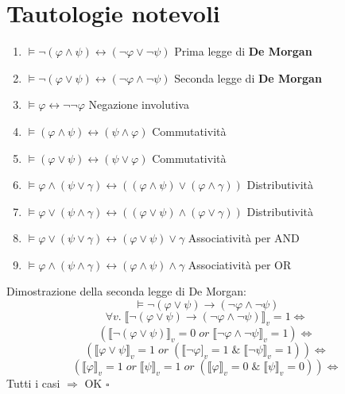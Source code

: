 \documentclass{article}
\theoremstyle{break}
\theoremstyle{break}
\theoremstyle{break}
\theoremstyle{break}
\begin{document}
\section{Tautologie notevoli}
\begin{enumerate}
  \item \( \models \neg (\varphi \wedge \psi) \leftrightarrow (\neg \varphi \vee \neg \psi) \) Prima legge di \textbf{De Morgan}
  \item \( \models \neg (\varphi \vee \psi) \leftrightarrow (\neg \varphi \wedge \neg \psi) \) Seconda legge di \textbf{De Morgan}
  \item \( \models \varphi \leftrightarrow \neg \neg \varphi \) Negazione involutiva
  \item \( \models (\varphi \wedge \psi) \leftrightarrow (\psi \wedge \varphi) \)  Commutatività
  \item \( \models (\varphi \vee \psi) \leftrightarrow (\psi \vee \varphi) \) Commutatività
  \item \( \models \varphi \wedge (\psi \vee \gamma) \leftrightarrow ((\varphi \wedge \psi) \vee (\varphi \wedge \gamma)) \) Distributività
  \item \( \models \varphi \vee (\psi \wedge \gamma) \leftrightarrow ((\varphi \vee \psi) \wedge (\varphi \vee \gamma)) \) Distributività
  \item \( \models \varphi \vee (\psi \vee \gamma) \leftrightarrow (\varphi \vee \psi) \vee \gamma \) Associatività per AND
  \item \( \models \varphi \wedge (\psi \wedge \gamma) \leftrightarrow (\varphi \wedge \psi) \wedge \gamma \) Associatività per OR
\end{enumerate}

\begin{exercise}
  Dimostrazione della seconda legge di De Morgan:
  \[
    \models \neg (\varphi \vee \psi) \to (\neg \varphi \wedge \neg \psi)
  \] 
  \[
    \forall v.\; \llbracket \neg(\varphi \vee \psi) \to (\neg \varphi \wedge \neg \psi)\rrbracket_v=1 \Leftrightarrow
  \] 
  \[
    (\llbracket \neg (\varphi \vee \psi)\rrbracket_v=0\; or\; \llbracket \neg \varphi \wedge \neg \psi\rrbracket_v=1) \Leftrightarrow
  \] 
  \[
    (\llbracket \varphi \vee \psi\rrbracket_v = 1 \;or\; (\llbracket \neg \varphi]_v=1\; \&\; \llbracket \neg \psi\rrbracket_v=1)) \Leftrightarrow
  \] 
  \[
    (\llbracket \varphi\rrbracket_v=1\;or\;\llbracket \psi\rrbracket_v=1\;or\;( \llbracket \varphi\rrbracket_v=0\; \&\; \llbracket \psi\rrbracket_v=0)) \Leftrightarrow
  \] 
  Tutti i casi \( \Rightarrow \) OK \( \square \)  
\end{exercise}
\end{document}
